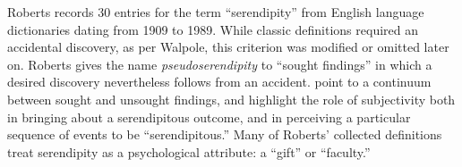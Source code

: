 
Roberts \cite[pp.~246--249]{roberts} records 30 entries for the term ``serendipity'' from English language dictionaries dating from 1909 to 1989.
%
While classic definitions required an accidental discovery, as per Walpole, this criterion was modified
or omitted later on.  Roberts gives the name \emph{pseudoserendipity} to
``sought findings'' in which a desired discovery nevertheless
follows from an accident.
\citet{Makri2012a,Makri2012b} point to a continuum between sought and
unsought findings, and highlight the role of subjectivity both in
bringing about a serendipitous outcome, and in perceiving a particular
sequence of events to be ``serendipitous.''
Many of Roberts' collected definitions treat serendipity
as a psychological attribute: a ``gift'' or ``faculty.''
